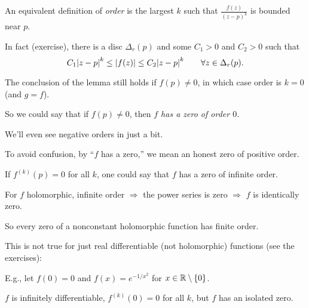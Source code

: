 \documentclass[10pt,aspectratio=169]{beamer}
\begin{document}
\begin{frame}
An equivalent definition of 
\emph{order} is the largest $k$ such that
$\frac{f(z)}{{(z-p)}^{k}}$ is bounded near $p$.

\medskip
\pause

In fact (exercise), there is a disc $\Delta_r(p)$ and some
$C_1 > 0$ and $C_2 > 0$ such that
\[
C_1 {\lvert {z-p} \rvert}^k
\leq
\lvert {f(z)} \rvert
\leq
C_2 {\lvert {z-p} \rvert}^k \qquad
\forall z \in \Delta_r(p) .
\]

\pause

The conclusion of the lemma still holds if $f(p)\not=0$, in which case
order is $k=0$ (and $g=f$).

\medskip
\pause

So we could say that if $f(p) \not=0$, then \emph{$f$ has a zero of order $0$.}

\medskip
\pause

We'll even see negative orders in just a bit.

\medskip
\pause

To avoid confusion, by ``$f$ has a zero,'' we mean an honest zero of positive order.

\medskip
\pause

If $f^{(k)}(p) = 0$ for all $k$, one could say that $f$
has a zero of infinite order.

\medskip
\pause

For $f$ holomorphic, infinite order $\Rightarrow$ the power series is
zero $\Rightarrow$ $f$ is identically zero.

\medskip
\pause

So every zero of a nonconstant holomorphic function has finite order.

\medskip
\pause

This is not true for just real differentiable (not holomorphic) functions (see the exercises):

E.g., let $f(0)=0$ and $f(x)=e^{-1/x^2}$ for $x \in {\mathbb{R}} \setminus \{ 0\}$.

$f$ is infinitely differentiable, $f^{(k)}(0)=0$ for all $k$, but
$f$ has an isolated zero.
\end{frame}
\end{document}
